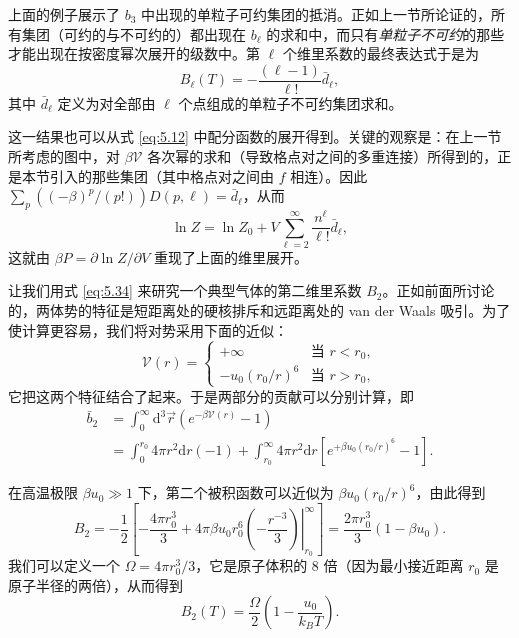 上面的例子展示了 $b_3$ 中出现的单粒子可约集团的抵消。正如上一节所论证的，所有集团（可约的与不可约的）都出现在 $b_\ell$ 的求和中，而只有\emph{单粒子不可约}的那些才能出现在按密度幂次展开的级数中。第 $\ell$ 个维里系数的最终表达式于是为
\begin{equation}\label{eq:5.36}
B_\ell(T)=-\frac{(\ell-1)}{\ell!}\bar d_\ell,
\end{equation}
其中 $\bar d_\ell$ 定义为对全部由 $\ell$ 个点组成的单粒子不可约集团求和。

这一结果也可以从式 \eqref{eq:5.12} 中配分函数的展开得到。关键的观察是：在上一节所考虑的图中，对 $\beta\mathscr V$ 各次幂的求和（导致格点对之间的多重连接）所得到的，正是本节引入的那些集团（其中格点对之间由 $f$ 相连）。因此 $\sum_p((-\beta)^p/(p!))D(p,\ell)=\bar d_\ell$，从而
\begin{equation}\label{eq:5.37}
\ln Z=\ln Z_0+V\sum_{\ell=2}^\infty\frac{n^\ell}{\ell!}\bar d_\ell,
\end{equation}
这就由 $\beta P=\partial\ln Z/\partial V$ 重现了上面的维里展开。


让我们用式 \eqref{eq:5.34} 来研究一个典型气体的第二维里系数 $B_2$。正如前面所讨论的，两体势的特征是短距离处的硬核排斥和远距离处的 van der Waals 吸引。为了使计算更容易，我们将对势采用下面的近似：
\begin{equation}\label{eq:5.38}
\mathscr V(r)=\begin{cases}
+\infty & \text{当 } r<r_0,\\
-u_0(r_0/r)^6 & \text{当 } r>r_0,
\end{cases}
\end{equation}
它把这两个特征结合了起来。于是两部分的贡献可以分别计算，即
\begin{equation}\label{eq:5.39}
\begin{aligned}
\bar b_2&=\int_0^\infty\mathrm{d}^3\vec r\left(e^{-\beta\mathscr V(r)}-1\right)\\
&=\int_0^{r_0}4\pi r^2\mathrm{d}r(-1)+\int_{r_0}^\infty4\pi r^2\mathrm{d}r\left[e^{+\beta u_0(r_0/r)^6}-1\right].
\end{aligned}
\end{equation}


在高温极限 $\beta u_0\gg1$ 下，第二个被积函数可以近似为 $\beta u_0(r_0/r)^6$，由此得到
\begin{equation}\label{eq:5.40}
B_2=-\frac12\left[-\frac{4\pi r_0^3}{3}+4\pi\beta u_0r_0^6\left.\left(-\frac{r^{-3}}{3}\right)\right|_{r_0}^\infty\right]=\frac{2\pi r_0^3}{3}(1-\beta u_0).
\end{equation}
我们可以定义一个 $\Omega=4\pi r_0^3/3$，它是原子体积的 8 倍（因为最小接近距离 $r_0$ 是原子半径的两倍），从而得到
\begin{equation}\label{eq:5.41}
B_2(T)=\frac{\Omega}{2}\left(1-\frac{u_0}{k_BT}\right).
\end{equation}

